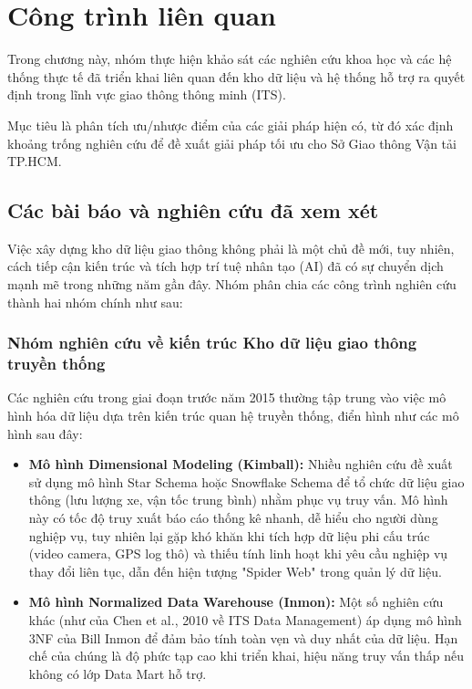 \section{Công trình liên quan}
Trong chương này, nhóm thực hiện khảo sát các nghiên cứu khoa học và các hệ thống thực tế đã triển khai liên quan đến kho dữ liệu và hệ thống hỗ trợ ra quyết định trong lĩnh vực giao thông thông minh (ITS).

Mục tiêu là phân tích ưu/nhược điểm của các giải pháp hiện có, từ đó xác định khoảng trống nghiên cứu để đề xuất giải pháp tối ưu cho Sở Giao thông Vận tải TP.HCM.

\subsection{Các bài báo và nghiên cứu đã xem xét}

Việc xây dựng kho dữ liệu giao thông không phải là một chủ đề mới, tuy nhiên, cách tiếp cận kiến trúc và tích hợp trí tuệ nhân tạo (AI) đã có sự chuyển dịch mạnh mẽ trong những năm gần đây. Nhóm phân chia các công trình nghiên cứu thành hai nhóm chính như sau:

\subsubsection{Nhóm nghiên cứu về kiến trúc Kho dữ liệu giao thông truyền thống}

Các nghiên cứu trong giai đoạn trước năm 2015 thường tập trung vào việc mô hình hóa dữ liệu dựa trên kiến trúc quan hệ truyền thống, điển hình như các mô hình sau đây:

\begin{itemize}
    \item \textbf{Mô hình Dimensional Modeling (Kimball):} Nhiều nghiên cứu đề xuất sử dụng mô hình Star Schema hoặc Snowflake Schema để tổ chức dữ liệu giao thông (lưu lượng xe, vận tốc trung bình) nhằm phục vụ truy vấn. Mô hình này có tốc độ truy xuất báo cáo thống kê nhanh, dễ hiểu cho người dùng nghiệp vụ, tuy nhiên lại gặp khó khăn khi tích hợp dữ liệu phi cấu trúc (video camera, GPS log thô) và thiếu tính linh hoạt khi yêu cầu nghiệp vụ thay đổi liên tục, dẫn đến hiện tượng "Spider Web" trong quản lý dữ liệu.
    
    \item \textbf{Mô hình Normalized Data Warehouse (Inmon):} Một số nghiên cứu khác (như của Chen et al., 2010 về ITS Data Management) áp dụng mô hình 3NF của Bill Inmon để đảm bảo tính toàn vẹn và duy nhất của dữ liệu. Hạn chế của chúng là độ phức tạp cao khi triển khai, hiệu năng truy vấn thấp nếu không có lớp Data Mart hỗ trợ.
\end{itemize}

